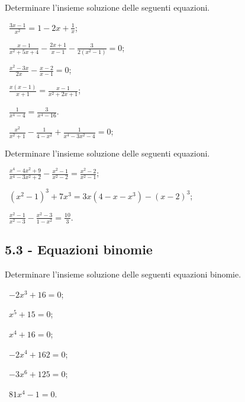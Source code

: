 \begin{esercizio}[\Ast]
 \label{ese:5.10}
Determinare l'insieme soluzione delle seguenti equazioni.
\begin{multicols}{2}
 \begin{enumeratea}
 \item~$\frac{3x-1}{x^2}=1-2x+\frac 1 x$;
 \item~$\frac{x-1}{x^2+5x+4}-\frac{2x+1}{x-1}-\frac 3{2\left(x^2-1\right)}=0$;
 \item~$\frac{x^2-3x}{2x}-\frac{x-2}{x-1}=0$;
 \item~$\frac{x(x-1)}{x+1}=\frac{x-1}{x^2+2x+1}$;
 \item~$\frac 1{x^4-4}=\frac 3{x^4-16}$.
 \item~$\frac{x^2}{x^2+1}-\frac 1{4-x^2}+\frac 1{x^4-3x^2-4}=0$;
 \end{enumeratea}
 \end{multicols}
\end{esercizio}


\begin{esercizio}[\Ast]
 \label{ese:5.11}
Determinare l'insieme soluzione delle seguenti equazioni.
 \begin{enumeratea}
 \item~$\frac{x^4-4x^2+9}{x^4-3x^2+2}-\frac{x^2-1}{x^2-2}=\frac{x^2-2}{x^2-1}$;
 \item~$(x^2-1)^3+7x^3=3x(4-x-x^3)-(x-2)^3$;
 \item~$\frac{x^2-1}{x^2-3}-\frac{x^2-3}{1-x^2}=\frac{10} 3$.
 \end{enumeratea}
\end{esercizio}

\subsection*{5.3 - Equazioni binomie}

\begin{esercizio}[\Ast]
 \label{ese:5.12}
Determinare l'insieme soluzione delle seguenti equazioni binomie.
\begin{multicols}{3}
 \begin{enumeratea}
 \item~$-2x^3+16=0$;
 \item~$x^5+15=0$;
 \item~$x^4+16=0$;
 \item~$-2x^4+162=0$;
 \item~$-3x^6+125=0$;
 \item~$81x^4-1=0$.
 \end{enumeratea}
 \end{multicols}
\end{esercizio}

